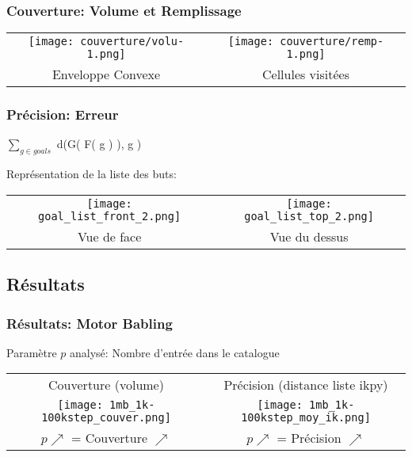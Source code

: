\documentclass[french]{beamer}
\begin{document}
\begin{frame}
    \frametitle{Couverture: Volume et Remplissage}
    
    \begin{tabular}{c c}
        \texttt{[image: couverture/volu-1.png]}

        &

        \texttt{[image: couverture/remp-1.png]}

        \\

        Enveloppe Convexe

        &

        Cellules visitées

    \end{tabular}

\end{frame}

\begin{frame}
    \frametitle{Précision: Erreur}
    
    \huge$\sum\limits_{g \in goals}$ d(\Large G( \large F( \normalsize g \large ) \Large ), g \huge)
    
    \vfill
    \center \normalsize
    Représentation de la liste des buts:

    \raggedleft
    \begin{tabular}{c c}
        \texttt{[image: goal\_list\_front\_2.png]} &
        \texttt{[image: goal\_list\_top\_2.png]}
        \\
        Vue de face & Vue du dessus
    \end{tabular}
\end{frame}

\subsection{Résultats}

\begin{frame}
    \frametitle{Résultats: Motor Babling}

    Paramètre $p$ analysé: Nombre d'entrée dans le catalogue
    \vfill

    \begin{tabular}{c c}
        Couverture (volume) & Précision (distance liste ikpy)
        \\
        \texttt{[image: 1mb\_1k-100kstep\_couver.png]} &
        \texttt{[image: 1mb\_1k-100kstep\_moy\_ik.png]}
        \\
        $p \nearrow$ = Couverture \color{green}$\nearrow$
        &
        $p \nearrow$ = Précision \color{green}$\nearrow$
    \end{tabular}
\end{frame}
\end{document}

